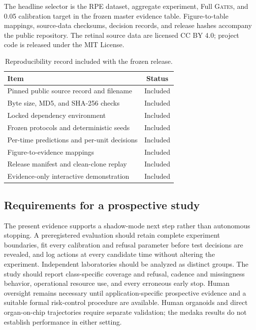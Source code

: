 \documentclass[11pt,twocolumn]{article}
\newcommand{\method}{\textsc{Gates}\xspace}
\begin{document}
The headline selector is the RPE dataset, aggregate experiment, Full \method, and 0.05 calibration
target in the frozen master evidence table. Figure-to-table mappings, source-data checksums,
decision records, and release hashes accompany the public repository. The retinal source data are
licensed CC BY 4.0; project code is released under the MIT License.

\begin{table}[H]
\centering
\caption{Reproducibility record included with the frozen release.}
\label{tab:repro}
\normalsize
\begin{tabularx}{\columnwidth}{@{}>{\raggedright\arraybackslash}X c@{}}
\toprule
Item & Status \\
\midrule
Pinned public source record and filename & Included \\
Byte size, MD5, and SHA-256 checks & Included \\
Locked dependency environment & Included \\
Frozen protocols and deterministic seeds & Included \\
Per-time predictions and per-unit decisions & Included \\
Figure-to-evidence mappings & Included \\
Release manifest and clean-clone replay & Included \\
Evidence-only interactive demonstration & Included \\
\bottomrule
\end{tabularx}
\end{table}

\subsection*{Requirements for a prospective study}

The present evidence supports a shadow-mode next step rather than autonomous stopping. A
preregistered evaluation should retain complete experiment boundaries, fit every calibration and
refusal parameter before test decisions are revealed, and log actions at every candidate time
without altering the experiment. Independent laboratories should be analyzed as distinct groups.
The study should report class-specific coverage and refusal, cadence and missingness behavior,
operational resource use, and every erroneous early stop. Human oversight remains necessary until
application-specific prospective evidence and a suitable formal risk-control procedure are
available. Human organoids and direct organ-on-chip trajectories require separate validation; the
medaka results do not establish performance in either setting.
\end{document}
